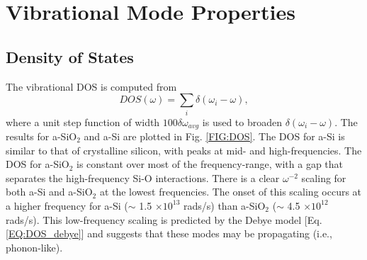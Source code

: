 \documentclass[aps,prb,onecolumn,preprint,superscriptaddress,footinbib,amsmath,amssymb,floatfix]{revtex4}
\begin{document}
\section{\label{S:Vibrational}Vibrational Mode Properties}

\subsection{\label{S:DOS}Density of States}

The vibrational DOS is computed from  
\begin{equation}\label{EQ:DOS}
DOS(\omega) = \sum_i \delta(\omega_i - \omega),
\end{equation}
where a unit step function of width $100\delta\omega_{avg}$ 
is used to broaden $\delta(\omega_i - \omega)$.   
The results for a-SiO$_2$ and a-Si are plotted in Fig. \ref{FIG:DOS}. 
The DOS for a-Si is similar to that of crystalline silicon,
\cite{donadio_atomistic_2009} with 
peaks at mid- and high-frequencies. The DOS for 
a-SiO$_2$ is constant over most of the frequency-range, 
with a gap that separates the high-frequency Si-O
interactions. 
There is a clear $\omega^{-2}$ scaling for both 
a-Si and a-SiO$_2$ at the lowest frequencies. 
The onset of this scaling occurs at a higher frequency 
for a-Si ($\sim$ 1.5 $\times 10^{13}$ rads/s) 
than a-SiO$_2$ ($\sim$ 4.5 $\times 10^{12}$ rads/s). 
This low-frequency scaling is predicted 
by the Debye model [Eq. \eqref{EQ:DOS_debye}] 
and suggests that these modes may be 
propagating (i.e., phonon-like). 
\end{document}
